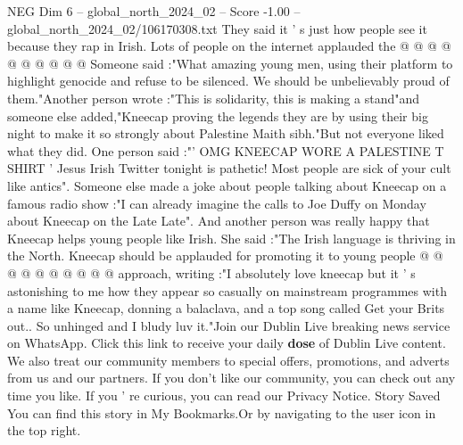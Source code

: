 \begin{textsample}{NEG Dim 6 – global\_north\_2024\_02 – Score -1.00 – global\_north\_2024\_02/106170308.txt}
They said it ' s just how people see it because they rap in Irish.
Lots of people on the internet applauded the @ @ @ @ @ @ @ @ @ @ Someone said :"What amazing young men, using their platform to highlight genocide and refuse to be silenced.
We should be unbelievably proud of them."Another person wrote :"This is solidarity, this is making a stand"and someone else added,"Kneecap proving the legends they are by using their big night to make it so strongly about Palestine Maith sibh."But not everyone liked what they did.
One person said :"' OMG KNEECAP WORE A PALESTINE T SHIRT ' Jesus Irish Twitter tonight is pathetic!
Most people are sick of your cult like antics".
Someone else made a joke about people talking about Kneecap on a famous radio show :"I can already imagine the calls to Joe Duffy on Monday about Kneecap on the Late Late".
And another person was really happy that Kneecap helps young people like Irish.
She said :"The Irish language is thriving in the North.
Kneecap should be applauded for promoting it to young people @ @ @ @ @ @ @ @ @ @ approach, writing :"I absolutely love kneecap but it ' s astonishing to me how they appear so casually on mainstream programmes with a name like Kneecap, donning a balaclava, and a top song called Get your Brits out..
So unhinged and I bludy luv it."Join our Dublin Live breaking news service on WhatsApp.
Click this link to receive your daily \textbf{dose} of Dublin Live content.
We also treat our community members to special offers, promotions, and adverts from us and our partners.
If you don't like our community, you can check out any time you like.
If you ' re curious, you can read our Privacy Notice.
Story Saved You can find this story in My Bookmarks.Or by navigating to the user icon in the top right.

\end{textsample}
